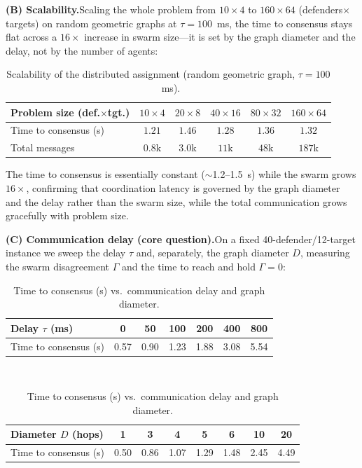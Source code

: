 \documentclass[11pt]{article}
\begin{document}
\medskip
\noindent\textbf{(B) Scalability.}\quad Scaling the whole problem from $10\times4$
to $160\times64$ (defenders$\times$targets) on random geometric graphs at
$\tau=100$~ms, the time to consensus stays flat across a $16\times$ increase in
swarm size---it is set by the graph diameter and the delay, not by the number of
agents:

\begin{table}[h]
\centering
\captionsetup{font=small}
\caption*{\small Scalability of the distributed assignment (random geometric graph,
$\tau=100$~ms).}
\begin{tabular}{lccccc}
\toprule
Problem size (def.$\times$tgt.) & $10\times4$ & $20\times8$ & $40\times16$ & $80\times32$ & $160\times64$ \\
\midrule
Time to consensus (s) & $1.21$ & $1.46$ & $1.28$ & $1.36$ & $1.32$ \\
Total messages & $0.8$k & $3.0$k & $11$k & $48$k & $187$k \\
\bottomrule
\end{tabular}
\end{table}

\noindent The time to consensus is essentially constant ($\sim$1.2--1.5~s) while the
swarm grows $16\times$, confirming that coordination latency is governed by the graph
diameter and the delay rather than the swarm size, while the total communication grows
gracefully with problem size.

\medskip
\noindent\textbf{(C) Communication delay (core question).}\quad On a fixed
40-defender/12-target instance we sweep the delay $\tau$ and, separately, the graph
diameter $D$, measuring the swarm disagreement $\Gamma$ and the time to reach and
hold $\Gamma=0$:

\begin{table}[h]
\centering
\captionsetup{font=small}
\caption*{\small Time to consensus (s) vs.\ communication delay and graph diameter.}
\begin{tabular}{lcccccc}
\toprule
Delay $\tau$ (ms) & 0 & 50 & 100 & 200 & 400 & 800 \\
\midrule
Time to consensus (s) & 0.57 & 0.90 & 1.23 & 1.88 & 3.08 & 5.54 \\
\bottomrule
\end{tabular}\\[4pt]
\begin{tabular}{lccccccc}
\toprule
Diameter $D$ (hops) & 1 & 3 & 4 & 5 & 6 & 10 & 20 \\
\midrule
Time to consensus (s) & 0.50 & 0.86 & 1.07 & 1.29 & 1.48 & 2.45 & 4.49 \\
\bottomrule
\end{tabular}
\end{table}
\end{document}
